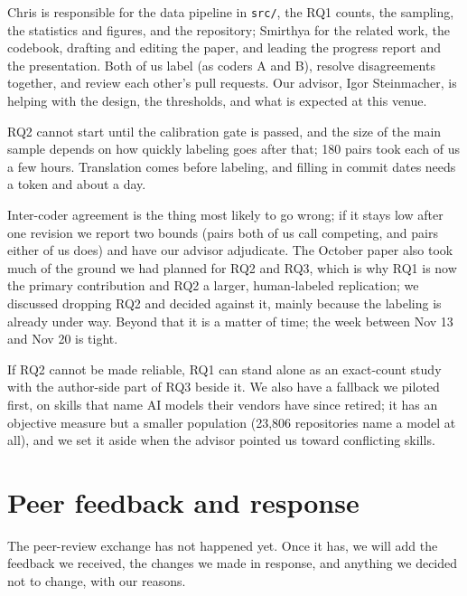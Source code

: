 \documentclass[11pt]{article}
\begin{document}
Chris is responsible for the data pipeline in \texttt{src/}, the RQ1 counts, the sampling, the statistics and figures, and
the repository; Smirthya for the related work, the codebook, drafting and editing the paper, and leading the progress report
and the presentation. Both of us label (as coders A and B), resolve disagreements together, and review each other's pull
requests. Our advisor, Igor Steinmacher, is helping with the design, the thresholds, and what is expected at this venue.

RQ2 cannot start until the calibration gate is passed, and the size of the main sample depends on how quickly labeling goes
after that; 180 pairs took each of us a few hours. Translation comes before labeling, and filling in commit dates needs a
token and about a day.

Inter-coder agreement is the thing most likely to go wrong; if it stays low after one revision we report two bounds (pairs
both of us call competing, and pairs either of us does) and have our advisor adjudicate. The October paper also took much of the ground we had planned for RQ2 and RQ3, which is why RQ1 is
now the primary contribution and RQ2 a larger, human-labeled replication; we discussed dropping RQ2 and decided against it,
mainly because the labeling is already under way. Beyond that it is a matter of time; the week between Nov 13 and Nov 20 is
tight.

If RQ2 cannot be made reliable, RQ1 can stand alone as an exact-count study with the author-side part of RQ3 beside it. We
also have a fallback we piloted first, on skills that name AI models their vendors have since retired; it has an objective
measure but a smaller population (23{,}806 repositories name a model at all), and we set it aside when the advisor pointed
us toward conflicting skills.

\section{Peer feedback and response}
The peer-review exchange has not happened yet. Once it has, we will add the feedback we received, the changes we made in
response, and anything we decided not to change, with our reasons.



\end{document}
